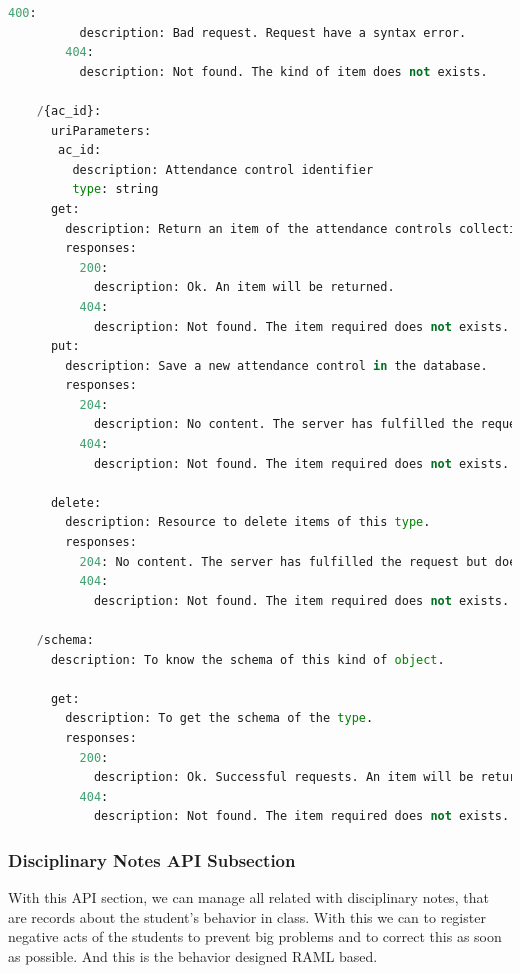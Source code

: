 \begin{lstlisting}[language=python,frame=none]
        400:
          description: Bad request. Request have a syntax error.
        404:
          description: Not found. The kind of item does not exists.

    /{ac_id}:
      uriParameters:
       ac_id:
         description: Attendance control identifier
         type: string
      get:
        description: Return an item of the attendance controls collection.
        responses:
          200:
            description: Ok. An item will be returned.
          404:
            description: Not found. The item required does not exists.
      put:
        description: Save a new attendance control in the database.
        responses:
          204:
            description: No content. The server has fulfilled the request but does not need to return an entity-body.
          404:
            description: Not found. The item required does not exists.

      delete:
        description: Resource to delete items of this type.
        responses:
          204: No content. The server has fulfilled the request but does not need to return an entity-body.
          404:
            description: Not found. The item required does not exists.

    /schema:
      description: To know the schema of this kind of object.

      get:
        description: To get the schema of the type.
        responses:
          200:
            description: Ok. Successful requests. An item will be returned.
          404:
            description: Not found. The item required does not exists.

\end{lstlisting}

\subsubsection{Disciplinary Notes API Subsection}

With this API section, we can manage all related with disciplinary notes, that
are records about the student's behavior in class. With this we can to register
negative acts of the students to prevent big problems and to correct this as soon
as possible. And this is the behavior designed RAML based.


